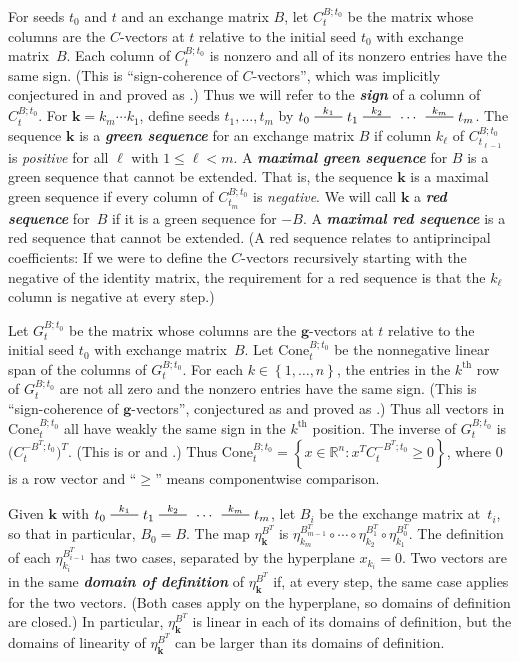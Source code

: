 \documentclass{amsart}
\theoremstyle{definition}
\theoremstyle{remark}
\numberwithin{equation}{section}
\newcommand{\newword}[1]{\textbf{\emph{#1}}}
\newcommand{\reals}{\mathbb R}
\newcommand{\edge}{\,\,\rule[2.7pt]{20pt}{0.5pt}\,\,}
\newcommand{\set}[1]{{\left\lbrace #1 \right\rbrace}}
\renewcommand{\th}{^\text{th}}
\newcommand{\0}{{\mathbf{0}}}
\newcommand{\Cone}{\mathrm{Cone}}
\newcommand{\g}{\mathbf{g}}
\newcommand{\kk}{\mathbf{k}}
\renewcommand{\th}{^\text{th}}
\begin{document}
For seeds $t_0$ and $t$ and an exchange matrix $B$, let $C_t^{B;t_0}$ be the matrix whose columns are the $C$-vectors at $t$ relative to the initial seed $t_0$ with exchange matrix~$B$.
Each column of $C_t^{B;t_0}$ is nonzero and all of its nonzero entries have the same sign.
(This is ``sign-coherence of $C$-vectors'', which was implicitly conjectured in \cite{FZ07} and proved as \cite[Corollary~5.5]{GHKK18}.)
Thus we will refer to the \newword{sign} of a column of $C_t^{B;t_0}$.
For $\kk=k_m\cdots k_1$, define seeds $t_1,\ldots,t_m$ by $t_0\overset{k_1}{\edge}t_1\overset{k_2}{\edge}\,\cdots\,\overset{k_m}{\edge}t_m$.
The sequence $\kk$ is a \newword{green sequence} for an exchange matrix $B$ if column $k_\ell$ of $C_{t_{\ell-1}}^{B;t_0}$ is \emph{positive} for all $\ell$ with $1\le\ell<m$.
A \newword{maximal green sequence} for $B$ is a green sequence that cannot be extended.
That is, the sequence $\kk$ is a maximal green sequence if every column of $C_{t_m}^{B;t_0}$ is \emph{negative}.
We will call $\kk$ a \newword{red sequence} for~$B$ if it is a green sequence for $-B$.
A \newword{maximal red sequence} is a red sequence that cannot be extended.
(A red sequence relates to antiprincipal coefficients: 
If we were to define the $C$-vectors recursively starting with the negative of the identity matrix, the requirement for a red sequence is that the $k_\ell$ column is negative at every step.)

Let $G_t^{B;t_0}$ be the matrix whose columns are the $\g$-vectors at $t$ relative to the initial seed $t_0$ with exchange matrix~$B$.
Let $\Cone^{B;t_0}_t$ be the nonnegative linear span of the columns of $G_t^{B;t_0}$.
For each $k\in\set{1,\ldots,n}$, the entries in the $k\th$ row of $G_t^{B;t_0}$ are not all zero and the nonzero entries have the same sign.
(This is ``sign-coherence of $\g$-vectors'', conjectured as \cite[Conjecture~6.13]{FZ07} and proved as \cite[Theorem 5.11]{GHKK18}.)
Thus all vectors in $\Cone^{B;t_0}_t$ all have weakly the same sign in the $k\th$ position.
The inverse of $G_t^{B;t_0}$ is $\bigl(C_t^{-B^T;t_0}\bigr)^T$.
(This is \cite[Theorem~1.2]{NZ12} or \cite[Theorem~1.1]{RS16} and \cite[Theorem~3.30]{RS16}.)
Thus $\Cone^{B;t_0}_t=\set{x\in\reals^n:x^TC_t^{-B^T;t_0}\ge0}$, where $0$ is a row vector and ``$\ge$'' means componentwise comparison. 

Given $\kk$ with $t_0\overset{k_1}{\edge}t_1\overset{k_2}{\edge}\,\cdots\,\overset{k_m}{\edge}t_m$, let $B_i$ be the exchange matrix at~$t_i$, so that in particular, $B_0=B$.
The map $\eta_{\kk}^{B^T}$ is ${\eta_{k_m}^{B_{m-1}^T}\circ\cdots\circ\eta_{k_2}^{B_1^T}\circ\eta_{k_1}^{B_0^T}}$.
The definition of each $\eta_{k_i}^{B_{i-1}^T}$ has two cases, separated by the hyperplane $x_{k_i}=0$.
Two vectors are in the same \newword{domain of definition} of $\eta_\kk^{B^T}$ if, at every step, the same case applies for the two vectors.
(Both cases apply on the hyperplane, so domains of definition are closed.)
In particular, $\eta_\kk^{B^T}$ is linear in each of its domains of definition, but the domains of linearity of $\eta_\kk^{B^T}$ can be larger than its domains of definition.
\end{document}
